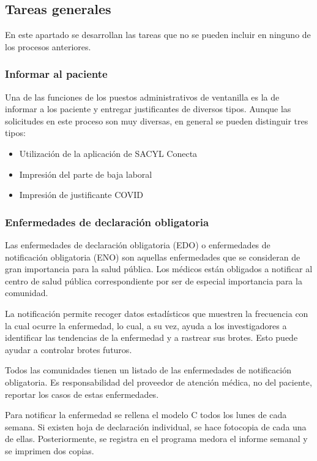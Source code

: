 \subsection{Tareas generales}

En este apartado se desarrollan las tareas que no se pueden incluir en ninguno de los procesos anteriores.

\subsubsection{Informar al paciente}

Una de las funciones de los puestos administrativos de ventanilla es la de informar a los paciente y entregar justificantes de diversos tipos. Aunque las solicitudes en este proceso son muy diversas, en general se pueden distinguir tres tipos:

\begin{itemize}
    \item Utilización de la aplicación de SACYL Conecta
    \item Impresión del parte de baja laboral
    \item Impresión de justificante COVID
\end{itemize}

\subsubsection{Enfermedades de declaración obligatoria}

Las enfermedades de declaración obligatoria (EDO) o enfermedades de notificación obligatoria (ENO) son aquellas enfermedades que se consideran de gran importancia para la salud pública. Los médicos están obligados a notificar al centro de salud pública correspondiente por ser de especial importancia para la comunidad.

La notificación permite recoger datos estadísticos que muestren la frecuencia con la cual ocurre la enfermedad, lo cual, a su vez, ayuda a los investigadores a identificar las tendencias de la enfermedad y a rastrear sus brotes. Esto puede ayudar a controlar brotes futuros.

Todos las comunidades tienen un listado de las enfermedades de notificación obligatoria. Es responsabilidad del proveedor de atención médica, no del paciente, reportar los casos de estas enfermedades.

Para notificar la enfermedad se rellena el modelo C todos los lunes de cada semana.
Si existen hoja de declaración individual, se hace fotocopia de cada una de ellas.
Posteriormente, se registra en el programa \Gls{medora} el informe semanal y se imprimen dos copias.

